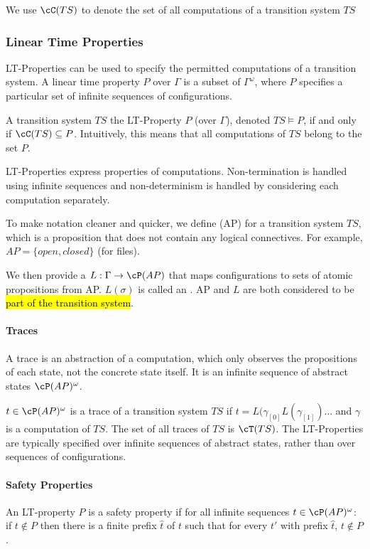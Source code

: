 We use $\cC(TS)$ to denote the set of all computations of a transition system $TS$



\subsubsection{Linear Time Properties}
LT-Properties can be used to specify the permitted computations of a transition system.
A linear time property $P$ over $\Gamma$ is a subset of $\Gamma^\omega$, where $P$ specifies a particular set of infinite sequences of configurations.

A transition system $TS$  the LT-Property $P$ (over $\Gamma$), denoted $TS \models P$, if and only if $\cC(TS) \subseteq P$.
Intuitively, this means that all computations of $TS$ belong to the set $P$.

LT-Properties  express properties of computations.
Non-termination is handled using infinite sequences and non-determinism is handled by considering each computation separately.

To make notation cleaner and quicker, we define  (AP) for a transition system $TS$, which is a proposition that does not contain any logical connectives.
For example, $AP = \{ open, closed \}$ (for files).

We then provide a  $L : \Gamma \rightarrow \cP(AP)$ that maps configurations to sets of atomic propositions from AP.
$L(\sigma)$ is called an . AP and $L$ are both considered to be \hl{part of the transition system}.


\paragraph{Traces}
A trace is an abstraction of a computation, which only observes the propositions of each state, not the concrete state itself.
It is an infinite sequence of abstract states $\cP(AP)^\omega$.

$t \in \cP(AP)^\omega$ is a trace of a transition system $TS$ if $t = L(\gamma_{[0]} L(\gamma_{[1]}) \ldots$ and $\gamma$ is a computation of $TS$.
The set of all traces of $TS$ is $\cT(TS)$.
The LT-Properties are typically specified over infinite sequences of abstract states, rather than over sequences of configurations.


\paragraph{Safety Properties}
\inlinedefinition An LT-property $P$ is a safety property if for all infinite sequences $t \in \cP(AP)^{\omega}$:
if $t \notin P$ then there is a finite prefix $\hat{t}$ of $t$ such that for every $t'$ with prefix $\hat{t}$, $t \notin P$.

